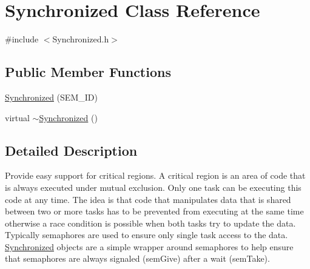 \hypertarget{classSynchronized}{
\section{Synchronized Class Reference}
\label{classSynchronized}
}


{\ttfamily \#include $<$Synchronized.h$>$}

\subsection*{Public Member Functions}
\begin{DoxyCompactItemize}
\item 
\hyperlink{classSynchronized_a05041c29b6ec042b9537f62e40f022fa}{Synchronized} (SEM\_\-ID)
\item 
virtual \hyperlink{classSynchronized_adeaa46ad24013f926eaaca662281efd3}{$\sim$Synchronized} ()
\end{DoxyCompactItemize}


\subsection{Detailed Description}
Provide easy support for critical regions. A critical region is an area of code that is always executed under mutual exclusion. Only one task can be executing this code at any time. The idea is that code that manipulates data that is shared between two or more tasks has to be prevented from executing at the same time otherwise a race condition is possible when both tasks try to update the data. Typically semaphores are used to ensure only single task access to the data. \hyperlink{classSynchronized}{Synchronized} objects are a simple wrapper around semaphores to help ensure that semaphores are always signaled (semGive) after a wait (semTake). 

